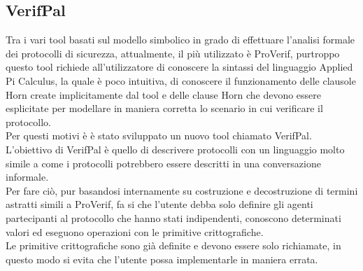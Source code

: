 \subsection{VerifPal}
Tra i vari tool basati sul modello simbolico in grado di effettuare l'analisi formale dei protocolli di sicurezza, attualmente, il più utilizzato è ProVerif, purtroppo questo tool richiede all'utilizzatore di conoscere la sintassi del linguaggio Applied Pi Calculus, la quale è poco intuitiva, di conoscere il funzionamento delle clausole Horn create implicitamente dal tool e delle clause Horn che devono essere esplicitate per modellare in maniera corretta lo scenario in cui verificare il protocollo.\\
Per questi motivi è è stato sviluppato un nuovo tool chiamato VerifPal.\\
L'obiettivo di VerifPal è quello di descrivere protocolli con un linguaggio molto simile a come i protocolli potrebbero essere descritti in una conversazione informale.\\
Per fare ciò, pur basandosi internamente su costruzione e decostruzione di termini astratti simili a ProVerif, fa si che l'utente debba solo definire gli agenti partecipanti al protocollo che hanno stati indipendenti, conoscono determinati valori ed eseguono operazioni con le primitive crittografiche.\\
Le primitive crittografiche sono già definite e devono essere solo richiamate, in questo modo si evita che l'utente possa implementarle in maniera errata.\\

